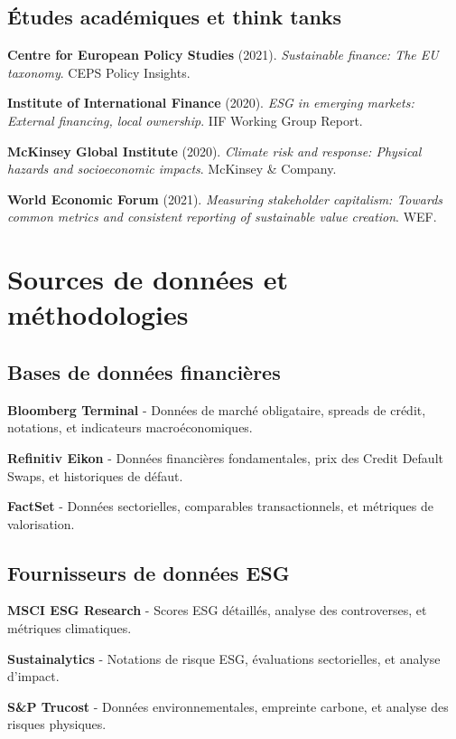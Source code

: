 \subsection{Études académiques et think tanks}

\textbf{Centre for European Policy Studies} (2021). \textit{Sustainable finance: The EU taxonomy}. CEPS Policy Insights.

\textbf{Institute of International Finance} (2020). \textit{ESG in emerging markets: External financing, local ownership}. IIF Working Group Report.

\textbf{McKinsey Global Institute} (2020). \textit{Climate risk and response: Physical hazards and socioeconomic impacts}. McKinsey \& Company.

\textbf{World Economic Forum} (2021). \textit{Measuring stakeholder capitalism: Towards common metrics and consistent reporting of sustainable value creation}. WEF.

\section{Sources de données et méthodologies}

\subsection{Bases de données financières}

\textbf{Bloomberg Terminal} - Données de marché obligataire, spreads de crédit, notations, et indicateurs macroéconomiques.

\textbf{Refinitiv Eikon} - Données financières fondamentales, prix des Credit Default Swaps, et historiques de défaut.

\textbf{FactSet} - Données sectorielles, comparables transactionnels, et métriques de valorisation.

\subsection{Fournisseurs de données ESG}

\textbf{MSCI ESG Research} - Scores ESG détaillés, analyse des controverses, et métriques climatiques.

\textbf{Sustainalytics} - Notations de risque ESG, évaluations sectorielles, et analyse d'impact.

\textbf{S\&P Trucost} - Données environnementales, empreinte carbone, et analyse des risques physiques.

